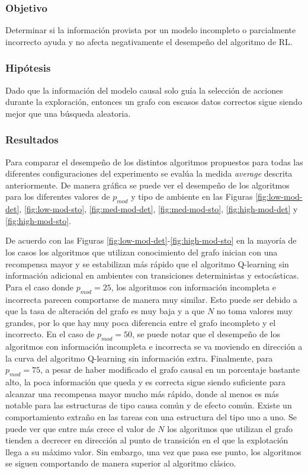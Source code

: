 \subsubsection{Objetivo}

Determinar si la información provista por un modelo
incompleto o parcialmente incorrecto ayuda y no
afecta negativamente el desempeño del algoritmo de RL.

\subsubsection{Hipótesis}

Dado que la información del modelo causal solo guía la selección
de acciones durante la exploración, entonces un grafo con escasos
datos correctos sigue siendo mejor que una búsqueda aleatoria. 


\subsubsection{Resultados}

Para comparar el desempeño de los distintos algoritmos propuestos
para todas las diferentes configuraciones del experimento
se evalúa la medida \textit{average} descrita anteriormente.
De manera gráfica se puede ver el desempeño de los algoritmos
para los diferentes valores de $p_{mod}$ y tipo de ambiente en las Figuras \ref{fig:low-mod-det}, \ref{fig:low-mod-sto}, \ref{fig:med-mod-det}, \ref{fig:med-mod-sto},  \ref{fig:high-mod-det} y \ref{fig:high-mod-sto}.

De acuerdo con las Figuras \ref{fig:low-mod-det}-\ref{fig:high-mod-sto}
en la mayoría de los casos los algoritmos que utilizan conocimiento del grafo inician con una recompensa mayor y se estabilizan más rápido que el algoritmo Q-learning
sin información adicional en ambientes con transiciones deterministas y estocásticas. Para el caso donde $p_{mod} = 25$, los algoritmos con información incompleta e incorrecta parecen 
comportarse de manera muy similar. Esto puede ser debido 
a que la tasa de alteración del grafo es muy baja y  a que $N$ no toma
valores muy grandes, por lo que hay muy poca diferencia entre el grafo incompleto y el incorrecto. 
En el caso de $p_{mod} = 50$, se
puede notar que el desempeño de los algoritmos
con información incompleta e incorrecta se 
va moviendo en dirección a la curva del algoritmo
Q-learning sin información extra.
Finalmente, para $p_{mod} = 75$,  a pesar de haber modificado el grafo 
causal en un porcentaje bastante alto, la poca información que queda y es correcta sigue siendo suficiente para alcanzar una recompensa mayor mucho más rápido, donde al menos es más notable para las estructuras de tipo causa común y de efecto común.
Existe un comportamiento extraño en las tareas con una estructura del tipo uno a uno. Se puede ver que entre más crece el valor de $N$ los algoritmos que utilizan el grafo tienden a decrecer en dirección al punto de transición en el que la explotación llega a su máximo valor. Sin embargo, una vez que pasa ese punto, los algoritmos se siguen comportando de manera superior al algoritmo clásico.


